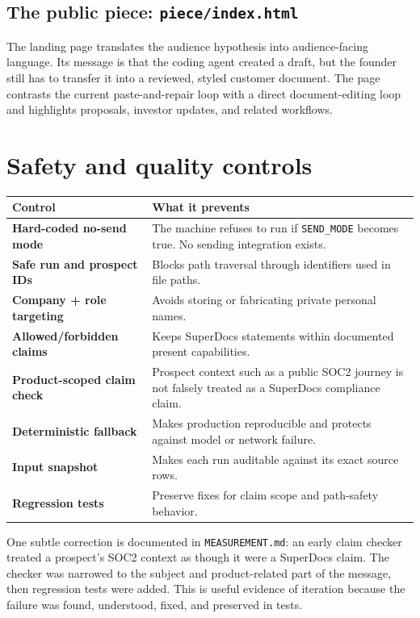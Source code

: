\documentclass[11pt,a4paper]{article}
\newcommand{\pathcode}[1]{\texttt{#1}}
\begin{document}
\subsection{The public piece: \pathcode{piece/index.html}}

The landing page translates the audience hypothesis into audience-facing language. Its message is that the coding agent created a draft, but the founder still has to transfer it into a reviewed, styled customer document. The page contrasts the current paste-and-repair loop with a direct document-editing loop and highlights proposals, investor updates, and related workflows.

\section{Safety and quality controls}

\begin{tabularx}{\textwidth}{>{\bfseries}p{} X}
\toprule
Control & What it prevents \\
\midrule
Hard-coded no-send mode & The machine refuses to run if \pathcode{SEND\_MODE} becomes true. No sending integration exists. \\
Safe run and prospect IDs & Blocks path traversal through identifiers used in file paths. \\
Company + role targeting & Avoids storing or fabricating private personal names. \\
Allowed/forbidden claims & Keeps SuperDocs statements within documented present capabilities. \\
Product-scoped claim check & Prospect context such as a public SOC2 journey is not falsely treated as a SuperDocs compliance claim. \\
Deterministic fallback & Makes production reproducible and protects against model or network failure. \\
Input snapshot & Makes each run auditable against its exact source rows. \\
Regression tests & Preserve fixes for claim scope and path-safety behavior. \\
\bottomrule
\end{tabularx}

One subtle correction is documented in \pathcode{MEASUREMENT.md}: an early claim checker treated a prospect's SOC2 context as though it were a SuperDocs claim. The checker was narrowed to the subject and product-related part of the message, then regression tests were added. This is useful evidence of iteration because the failure was found, understood, fixed, and preserved in tests.
\end{document}
